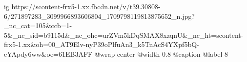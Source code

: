  
 
 
 
 

\ifcmt
  ig https://scontent-frx5-1.xx.fbcdn.net/v/t39.30808-6/271897283_3099966893606804_1709798119813875652_n.jpg?_nc_cat=105&ccb=1-5&_nc_sid=b9115d&_nc_ohc=urZVm5kDqSMAX8xzqnU&_nc_ht=scontent-frx5-1.xx&oh=00_AT9Elv-nyP39oPlfuAn3_k5TnAcS4YXpf5bQ-eYApdy6ww&oe=61EB3AFF
	@wrap center
	@width 0.8
  @caption @label 8
\fi
